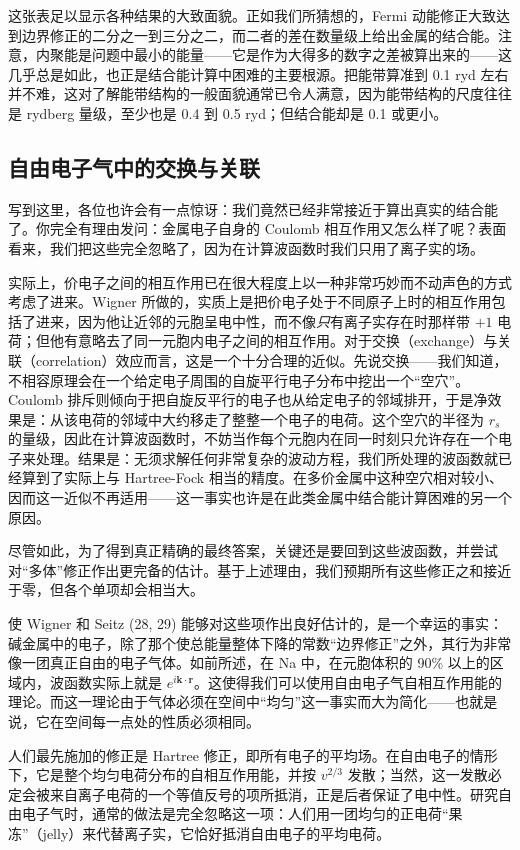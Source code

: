 这张表足以显示各种结果的大致面貌。正如我们所猜想的，Fermi 动能修正大致达到边界修正的二分之一到三分之二，而二者的差在数量级上给出金属的结合能。注意，内聚能是问题中最小的能量——它是作为大得多的数字之差被算出来的——这几乎总是如此，也正是结合能计算中困难的主要根源。把能带算准到 0.1 ryd 左右并不难，这对了解能带结构的一般面貌通常已令人满意，因为能带结构的尺度往往是 rydberg 量级，至少也是 0.4 到 0.5 ryd；但结合能却是 0.1 或更小。

\subsection{自由电子气中的交换与关联}

写到这里，各位也许会有一点惊讶：我们竟然已经非常接近于算出真实的结合能了。你完全有理由发问：金属电子自身的 Coulomb 相互作用又怎么样了呢？表面看来，我们把这些完全忽略了，因为在计算波函数时我们只用了离子实的场。

实际上，价电子之间的相互作用已在很大程度上以一种非常巧妙而不动声色的方式考虑了进来。Wigner 所做的，实质上是把价电子处于不同原子上时的相互作用包括了进来，因为他让近邻的元胞呈电中性，而不像\emph{只}有离子实存在时那样带 $+1$ 电荷；但他有意略去了同一元胞内电子之间的相互作用。对于交换（exchange）与关联（correlation）效应而言，这是一个十分合理的近似。先说交换——我们知道，不相容原理会在一个给定电子周围的自旋平行电子分布中挖出一个“空穴”。Coulomb 排斥则倾向于把自旋反平行的电子也从给定电子的邻域排开，于是净效果是：从该电荷的邻域中大约移走了整整一个电子的电荷。这个空穴的半径为 $r_s$ 的量级，因此在计算波函数时，不妨当作每个元胞内在同一时刻只允许存在一个电子来处理。结果是：无须求解任何非常复杂的波动方程，我们所处理的波函数就已经算到了实际上与 Hartree-Fock 相当的精度。在多价金属中这种空穴相对较小、因而这一近似不再适用——这一事实也许是在此类金属中结合能计算困难的另一个原因。

尽管如此，为了得到真正精确的最终答案，关键还是要回到这些波函数，并尝试对“多体”修正作出更完备的估计。基于上述理由，我们预期所有这些修正之和接近于零，但各个单项却会相当大。

使 Wigner 和 Seitz (28, 29) 能够对这些项作出良好估计的，是一个幸运的事实：碱金属中的电子，除了那个使总能量整体下降的常数“边界修正”之外，其行为非常像一团真正自由的电子气体。如前所述，在 Na 中，在元胞体积的 90\% 以上的区域内，波函数实际上就是 $e^{i\mathbf{k}\cdot\mathbf{r}}$。这使得我们可以使用自由电子气自相互作用能的理论。而这一理论由于气体必须在空间中“均匀”这一事实而大为简化——也就是说，它在空间每一点处的性质必须相同。

人们最先施加的修正是 Hartree 修正，即所有电子的平均场。在自由电子的情形下，它是整个均匀电荷分布的自相互作用能，并按 $v^{2/3}$ 发散；当然，这一发散必定会被来自离子电荷的一个等值反号的项所抵消，正是后者保证了电中性。研究自由电子气时，通常的做法是完全忽略这一项：人们用一团均匀的正电荷“果冻”（jelly）来代替离子实，它恰好抵消自由电子的平均电荷。

